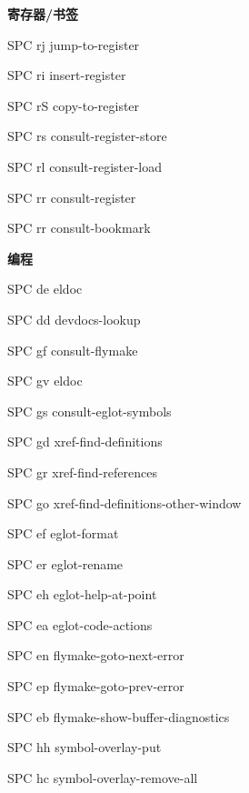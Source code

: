 \documentclass[10pt]{article}
\renewcommand\section[1]{\bigskip\par\textbf{\color{heading}\large#1}\smallskip}
\renewcommand\subsection[1]{\smallskip\par\textbf{\color{heading}#1}}
\begin{document}
\begin{CJK}{UTF8}{gbsn}
\begin{multicols}{3}
  \subsection{寄存器/书签}
  \begin{keylist}
  \item[SPC rj] jump-to-register
  \item[SPC ri] insert-register
  \item[SPC rS] copy-to-register
  \item[SPC rs] consult-register-store
  \item[SPC rl] consult-register-load
  \item[SPC rr] consult-register
  \item[SPC rr] consult-bookmark
  \end{keylist}

  \section{编程}
  \begin{keylist}
  \item[SPC de] eldoc
  \item[SPC dd] devdocs-lookup
  \item[SPC gf] consult-flymake
  \item[SPC gv] eldoc
  \item[SPC gs] consult-eglot-symbols
  \item[SPC gd] xref-find-definitions
  \item[SPC gr] xref-find-references
  \item[SPC go] xref-find-definitions-other-window
  \item[SPC ef] eglot-format
  \item[SPC er] eglot-rename

  \item[SPC eh] eglot-help-at-point
  \item[SPC ea] eglot-code-actions
  \item[SPC en] flymake-goto-next-error
  \item[SPC ep] flymake-goto-prev-error
  \item[SPC eb] flymake-show-buffer-diagnostics
  \item[SPC hh] symbol-overlay-put
  \item[SPC hc] symbol-overlay-remove-all
  \end{keylist}


\end{multicols}
\end{CJK}
\end{document}
